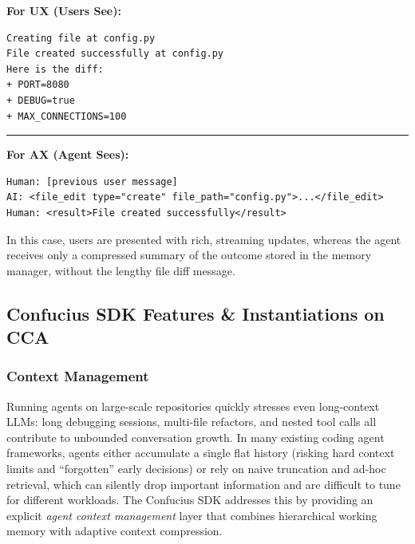 \noindent
\begin{tcolorbox}[
  width=\columnwidth,
  colback=white,
  colframe=black!25,
  boxrule=0.4pt,
  arc=2pt,
  left=4pt,right=4pt,top=4pt,bottom=4pt,
  breakable
]
\textbf{For UX (Users See):}
\vspace{2pt}
\begin{lstlisting}[style=colcode]
Creating file at config.py
File created successfully at config.py
Here is the diff:
+ PORT=8080
+ DEBUG=true
+ MAX_CONNECTIONS=100
\end{lstlisting}

\vspace{0.4em}
\hrule
\vspace{0.4em}

\textbf{For AX (Agent Sees):}
\vspace{2pt}
\begin{lstlisting}[style=colcode]
Human: [previous user message]
AI: <file_edit type="create" file_path="config.py">...</file_edit>
Human: <result>File created successfully</result>
\end{lstlisting}
\end{tcolorbox}

In this case, users are presented with rich, streaming updates, whereas the agent receives only a compressed summary of the outcome stored in the memory manager, without the lengthy file diff message.


\subsection{Confucius SDK Features \& Instantiations on CCA}
\label{sec.feat}

\subsubsection{Context Management}
\label{sec.context_management}



Running agents on large-scale repositories quickly stresses even long-context LLMs: long debugging sessions, multi-file refactors, and nested tool calls all contribute to unbounded conversation growth. In many existing coding agent frameworks, agents either accumulate a single flat history (risking hard context limits and ``forgotten'' early decisions) or rely on naive truncation and ad-hoc retrieval, which can silently drop important information and are difficult to tune for different workloads. 
The Confucius SDK addresses this by providing an explicit \emph{agent context management} layer that combines hierarchical working memory with adaptive context compression.

